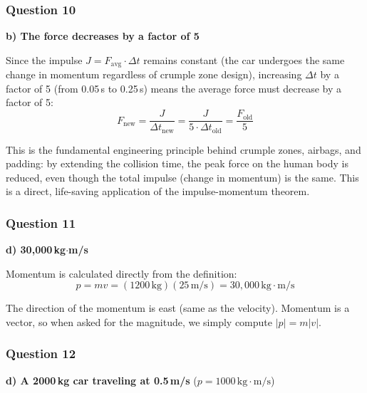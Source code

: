 \documentclass[12pt,letterpaper]{article}
\begin{document}
\subsubsection*{Question 10}

\begin{answerbox}
\textbf{b) The force decreases by a factor of 5}
\end{answerbox}

\begin{explanationbox}
Since the impulse $J = F_{\text{avg}} \cdot \Delta t$ remains constant (the car undergoes the same change in momentum regardless of crumple zone design), increasing $\Delta t$ by a factor of 5 (from 0.05\,s to 0.25\,s) means the average force must decrease by a factor of 5:
\[
F_{\text{new}} = \frac{J}{\Delta t_{\text{new}}} = \frac{J}{5 \cdot \Delta t_{\text{old}}} = \frac{F_{\text{old}}}{5}
\]

This is the fundamental engineering principle behind crumple zones, airbags, and padding: by extending the collision time, the peak force on the human body is reduced, even though the total impulse (change in momentum) is the same. This is a direct, life-saving application of the impulse-momentum theorem.
\end{explanationbox}

\subsubsection*{Question 11}

\begin{answerbox}
\textbf{d) 30{,}000\,kg$\cdot$m/s}
\end{answerbox}

\begin{explanationbox}
Momentum is calculated directly from the definition:
\[
p = mv = (1200\,\text{kg})(25\,\text{m/s}) = 30{,}000\,\text{kg}\cdot\text{m/s}
\]

The direction of the momentum is east (same as the velocity). Momentum is a vector, so when asked for the magnitude, we simply compute $|p| = m|v|$.
\end{explanationbox}

\subsubsection*{Question 12}

\begin{answerbox}
\textbf{d) A 2000\,kg car traveling at 0.5\,m/s} ($p = 1000\,\text{kg}\cdot\text{m/s}$)
\end{answerbox}
\end{document}
